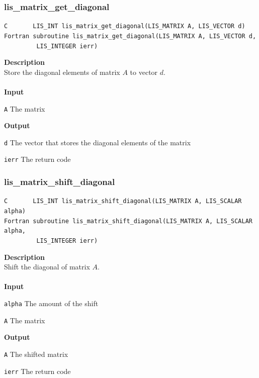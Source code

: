 \documentclass[a4paper]{article}
\newcommand{\namelistlabel}[1]{\mbox{#1}\hfill}
\newenvironment{namelist}[1]{%
\begin{list}{}
  {\let\makelabel\namelistlabel
  \settowidth{\labelwidth}{#1}
  \setlength{\leftmargin}{1.1\labelwidth}}
  }{%
\end{list}}
\begin{document}
\subsubsection{lis\_matrix\_get\_diagonal}
\begin{screen}
\verb|C       LIS_INT lis_matrix_get_diagonal(LIS_MATRIX A, LIS_VECTOR d)|\\
\verb|Fortran subroutine lis_matrix_get_diagonal(LIS_MATRIX A, LIS_VECTOR d,|\\
\verb|         LIS_INTEGER ierr) |
\end{screen}
{\bf Description}\\
\indent
Store the diagonal elements of matrix $A$ to vector $d$.
\\ \\
\noindent
{\bf Input}
\begin{namelist}{XXXXXXXXXXXXXXXXXXXX}
\item[\tt A] The matrix
\end{namelist}
{\bf Output}
\begin{namelist}{XXXXXXXXXXXXXXXXXXXX}
\item[\tt d] The vector that stores the diagonal elements of the matrix
\item[\tt ierr] The return code
\end{namelist}

\subsubsection{lis\_matrix\_shift\_diagonal}
\begin{screen}
\verb|C       LIS_INT lis_matrix_shift_diagonal(LIS_MATRIX A, LIS_SCALAR alpha)|\\
\verb|Fortran subroutine lis_matrix_shift_diagonal(LIS_MATRIX A, LIS_SCALAR alpha,|\\
\verb|         LIS_INTEGER ierr) |
\end{screen}
{\bf Description}\\
\indent
Shift the diagonal of matrix $A$.
\\ \\
\noindent
{\bf Input}
\begin{namelist}{XXXXXXXXXXXXXXXXXXXX}
\item[\tt alpha] The amount of the shift
\item[\tt A] The matrix
\end{namelist}
{\bf Output}
\begin{namelist}{XXXXXXXXXXXXXXXXXXXX}
\item[\tt A] The shifted matrix
\item[\tt ierr] The return code
\end{namelist}
\end{document}
